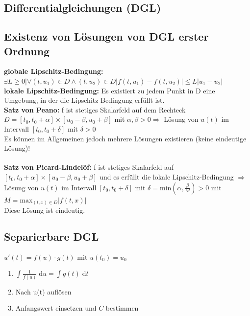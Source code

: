 \documentclass[6pt,a4paper]{scrartcl}
\newcommand{\abs}[1]{\ensuremath{\left\vert#1\right\vert}}                                      %
\newcommand{\diff}{\ensuremath{\;\mathrm d}}                                   %
\begin{document}
\begin{multicols*}{4}
    \section{Differentialgleichungen (DGL)}
    \subsection{Existenz von Lösungen von DGL erster Ordnung}
    \textbf{globale Lipschitz-Bedingung:} $\exists L \geq 0 | \forall (t, u_1) \in D \wedge (t, u_2) \in D \abs{f(t,u_1)-f(t,u_2)} \leq L\abs{u_1-u_2}$ \\
    \textbf{lokale Lipschitz-Bedingung:} Es existiert zu jedem Punkt in D eine Umgebung, in der die Lipschitz-Bedingung erfüllt ist.\\
    \textbf{Satz von Peano:} f ist stetiges Skalarfeld auf dem Rechteck $D = [t_0, t_0 + \alpha] \times [u_0-\beta , u_0+\beta]$ mit $\alpha, \beta > 0 \Rightarrow$ Lösung von $u(t)$ im Intervall $[t_0, t_0+\delta]$ mit $\delta > 0$\\
    Es können im Allgemeinen jedoch mehrere Lösungen existieren (keine eindeutige Lösung)!\\ \\
    \textbf{Satz von Picard-Lindelöf:} f ist stetiges Skalarfeld auf $[t_0, t_0 + \alpha] \times [u_0-\beta , u_0+\beta]$ und es erfüllt die lokale Lipschitz-Bedingung $\Rightarrow$ Lösung von $u(t)$ im Intervall $[t_0, t_0+\delta]$ mit $\delta = \text{min}(\alpha, \frac{\beta}{M}) > 0$ mit $M = \text{max}_{(t,x)\in D}\abs{f(t,x)}$\\
    Diese Lösung ist eindeutig.

    \subsection{Separierbare DGL}\label{sec:sep-dgl}
    $\boxed{u'(t) = f(u) \cdot g(t)}$ mit $u(t_0) = u_0$\\
    \begin{enumerate}
        \item $\int \frac{1}{f(u)} \diff u = \int g(t) \diff t$
        \item Nach u(t) auflösen
        \item Anfangswert einsetzen und $C$ bestimmen
    \end{enumerate}


\end{multicols*}
\end{document}
